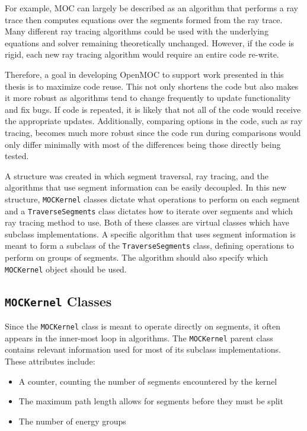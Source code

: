 For example, MOC can largely be described as an algorithm that performs a ray trace then computes equations over the segments formed from the ray trace. Many different ray tracing algorithms could be used with the underlying equations and solver remaining theoretically unchanged. However, if the code is rigid, each new ray tracing algorithm would require an entire code re-write.

Therefore, a goal in developing OpenMOC to support work presented in this thesis is to maximize code reuse. This not only shortens the code but also makes it more robust as algorithms tend to change frequently to update functionality and fix bugs. If code is repeated, it is likely that not all of the code would receive the appropriate updates. Additionally, comparing options in the code, such as ray tracing, becomes much more robust since the code run during comparisons would only differ minimally with most of the differences being those directly being tested.

A structure was created in which segment traversal, ray tracing, and the algorithms that use segment information can be easily decoupled. In this new structure, \texttt{MOCKernel} classes dictate what operations to perform on each segment and a \texttt{TraverseSegments} class dictates how to iterate over segments and which ray tracing method to use. Both of these classes are virtual classes which have subclass implementations. A specific algorithm that uses segment information is meant to form a subclass of the \texttt{TraverseSegments} class, defining operations to perform on groups of segments. The algorithm should also specify which \texttt{MOCKernel} object should be used.

\subsection{\texttt{MOCKernel} Classes}

Since the \texttt{MOCKernel} class is meant to operate directly on segments, it often appears in the inner-most loop in algorithms. The \texttt{MOCKernel} parent class contains relevant information used for most of its subclass implementations. These attributes include:
\begin{itemize}
	\item A counter, counting the number of segments encountered by the kernel
	\item The maximum path length allows for segments before they must be split
	\item The number of energy groups
\end{itemize}

